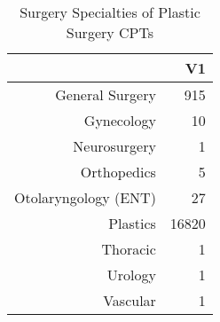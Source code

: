 \begin{table}[ht]
\centering
\begin{tabular}{rr}
  \hline
 & V1 \\ 
  \hline
General Surgery & 915 \\ 
  Gynecology &  10 \\ 
  Neurosurgery &   1 \\ 
  Orthopedics &   5 \\ 
  Otolaryngology (ENT) &  27 \\ 
  Plastics & 16820 \\ 
  Thoracic &   1 \\ 
  Urology &   1 \\ 
  Vascular &   1 \\ 
   \hline
\end{tabular}
\caption{Surgery Specialties of Plastic Surgery CPTs} 
\end{table}

